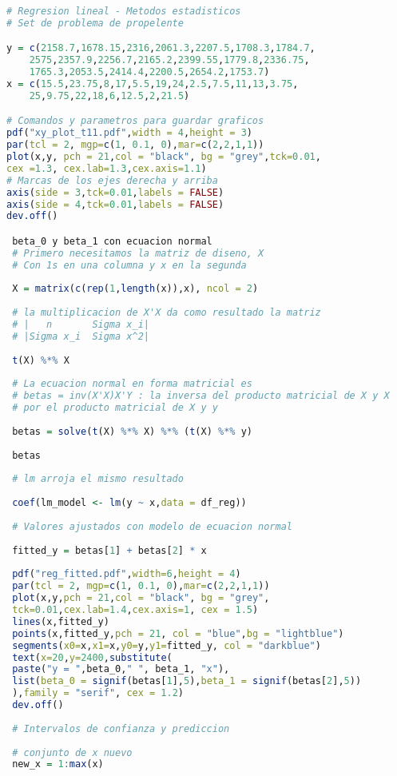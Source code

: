 \documentclass[letterpaper,12pt]{article}
\begin{document}
\begin{lstlisting}[language=R]
# Regresion lineal - Metodos estadisticos
# Set de problema de propelente

y = c(2158.7,1678.15,2316,2061.3,2207.5,1708.3,1784.7,
	2575,2357.9,2256.7,2165.2,2399.55,1779.8,2336.75,
	1765.3,2053.5,2414.4,2200.5,2654.2,1753.7)
x = c(15.5,23.75,8,17,5.5,19,24,2.5,7.5,11,13,3.75,
	25,9.75,22,18,6,12.5,2,21.5)

# Comandos y parametros para guardar graficos
pdf("xy_plot_t11.pdf",width = 4,height = 3)
par(tcl = 2, mgp=c(1, 0.1, 0),mar=c(2,2,1,1))
plot(x,y, pch = 21,col = "black", bg = "grey",tck=0.01,
cex =1.3, cex.lab=1.3,cex.axis=1.1)
# Marcas de los ejes derecha y arriba
axis(side = 3,tck=0.01,labels = FALSE)
axis(side = 4,tck=0.01,labels = FALSE)
dev.off()

 beta_0 y beta_1 con ecuacion normal
 # Primero necesitamos la matriz de diseno, X
 # Con 1s en una columna y x en la segunda
 
 X = matrix(c(rep(1,length(x)),x), ncol = 2)
 
 # la multiplicacion de X'X da como resultado la matriz
 # |   n       Sigma x_i| 
 # |Sigma x_i  Sigma x^2|
 
 t(X) %*% X 
 
 # La ecuacion normal en forma matricial es
 # betas = inv(X'X)X'Y : la inversa del producto matricial de X y X
 # por el producto matricial de X y y
 
 betas = solve(t(X) %*% X) %*% (t(X) %*% y)
 
 betas
 
 # lm arroja el mismo resultado
 
 coef(lm_model <- lm(y ~ x,data = df_reg))
 
 # Valores ajustados con modelo de ecuacion normal
 
 fitted_y = betas[1] + betas[2] * x
 
 pdf("reg_fitted.pdf",width=6,height = 4)
 par(tcl = 2, mgp=c(1, 0.1, 0),mar=c(2,2,1,1))
 plot(x,y,pch = 21,col = "black", bg = "grey",
 tck=0.01,cex.lab=1.4,cex.axis=1, cex = 1.5)
 lines(x,fitted_y)
 points(x,fitted_y,pch = 21, col = "blue",bg = "lightblue")
 segments(x0=x,x1=x,y0=y,y1=fitted_y, col = "darkblue")
 text(x=20,y=2400,substitute(
 paste("y = ",beta_0," ", beta_1, "x"),
 list(beta_0 = signif(betas[1],5),beta_1 = signif(betas[2],5))
 ),family = "serif", cex = 1.2)
 dev.off()
 
 # Intervalos de confianza y prediccion
 
 # conjunto de x nuevo
 new_x = 1:max(x)
 

\end{lstlisting}
\end{document}
